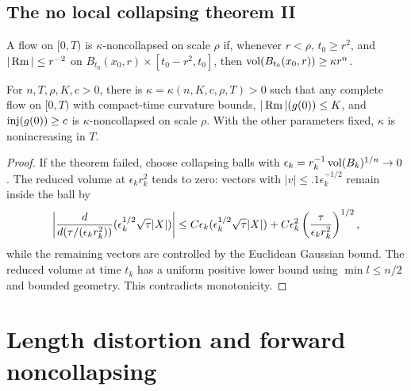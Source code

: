 \subsection{The no local collapsing theorem II} \label{I.7.3}
\begin{definition}
  \label{def:kl-no-local-collapsing-theorem-ii-kappa-noncollapsing}


  \label{noncollapsed2}
A flow on $[0,T)$ is $\kappa$-noncollapsed on scale $\rho$ if, whenever
$r<\rho$, $t_0\ge r^2$, and $|\operatorname{Rm}|\le r^{-2}$ on
$B_{t_0}(x_0,r)\times[t_0-r^2,t_0]$, then
$\operatorname{vol}(B_{t_0}(x_0,r))\ge\kappa r^n$.
\end{definition}

\begin{theorem}
  \label{thm:kl-no-local-collapsing-theorem-ii-existence-kappa-solutions}
  \label{nolocalcollapse}
For $n,T,\rho,K,c>0$, there is $\kappa=\kappa(n,K,c,\rho,T)>0$ such that any
complete flow on $[0,T)$ with compact-time curvature bounds,
$|\operatorname{Rm}|(g(0))\le K$, and $\operatorname{inj}(g(0))\ge c$ is $\kappa$-noncollapsed on scale $\rho$.
With the other parameters fixed, $\kappa$ is nonincreasing in $T$.
\end{theorem}
\begin{proof}
\sketch
If the theorem failed, choose collapsing balls with
$\epsilon_k=r_k^{-1}\operatorname{vol}(B_k)^{1/n}\to0$. The reduced volume at
$\epsilon_kr_k^2$ tends to zero: vectors with $|v|\le .1\epsilon_k^{-1/2}$ remain
inside the ball by
\begin{equation}\label{diffmess}
\left|{d\over d(\tau/(\epsilon_kr_k^2))}(\epsilon_k^{1/2}\sqrt\tau|X|)\right|
\le C\epsilon_k(\epsilon_k^{1/2}\sqrt\tau|X|)+C\epsilon_k^2\left({\tau\over\epsilon_kr_k^2}\right)^{1/2},
\end{equation}
while the remaining vectors are controlled by the Euclidean Gaussian bound.
The reduced volume at time $t_k$ has a uniform positive lower bound using
$\min l\le n/2$ and bounded geometry. This contradicts monotonicity.
\end{proof}

\section{Length distortion and forward noncollapsing}
